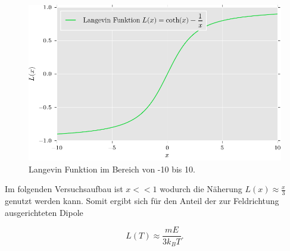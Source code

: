\begin{figure}
  \label{fig:langevin}
  \includegraphics{./plots/langevin.pdf}
  \caption{Langevin Funktion im Bereich von -10 bis 10.}
\end{figure}


Im folgenden Versuchsaufbau ist $ x << 1 $ wodurch die Näherung $L(x) \approx \frac{x}{3}$ genutzt werden kann. Somit ergibt sich für den Anteil der zur Feldrichtung
ausgerichteten Dipole

\begin{equation}
  \label{eq:dipoles}
  L(T) \approx \frac{m E}{3 k_B T}.
\end{equation}
